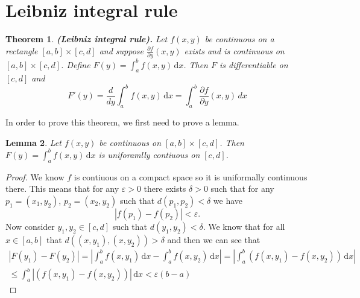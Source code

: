 \documentclass[11pt,a4paper]{article}
\theoremstyle{definition}
\theoremstyle{plain}
\newtheorem{theorem}{Theorem}[section]
\newtheorem{lemma}[theorem]{Lemma}
\newcommand\dx    {\,\mathrm{d}x}
\newcommand{\abs}[1]{\left\lvert #1\right\rvert}
\renewcommand{\tt}[1]{\textnormal{\textbf{(#1).}}} %
\begin{document}
	\newpage
	
	\section{Leibniz integral rule}
  \begin{theorem}\label{thm:leibniz-integral-rule}\tt{Leibniz integral rule}
    Let $f(x,y)$ be continuous on a rectangle $[a,b] \times [c,d]$ 
    and suppose $\frac{\partial f}{\partial y}(x,y)$ exists and is continuous 
    on $[a,b] \times [c,d]$. 
    Define $F(y) = \int_a^b{f(x,y)}\dx$.
    Then $F$ is differentiable on $[c,d]$ and
    \[
      F'(y) =
      \frac{d}{dy}\int_a^b{f(x,y)}\dx =
      \int_{a}^{b}{\frac{\partial f}{\partial y}(x,y)\, dx}
    \]
  \end{theorem}
  
  In order to prove this theorem, we first need to prove a lemma.
  \begin{lemma}
    Let $f(x,y)$ be continuous on $[a,b] \times [c,d]$.
    Then $F(y) = \int_{a}^{b} f(x,y)\dx$ is uniforamlly contiuous on $[c,d]$.
  \end{lemma}
  \begin{proof}
    We know $f$ is contiuous on a compact space so it is uniformally continuous 
    there. This means that for any $\varepsilon > 0$ there exists $\delta > 0$
    such that for any $p_1 = (x_1,y_2)$, $p_2 = (x_2,y_2)$ such that 
    $d(p_1,p_2) < \delta$ we have
    \[
      \abs{f(p_1) - f(p_2)} < \varepsilon.
    \]
    Now consider $y_1, y_2 \in[c,d]$ such that $d(y_1,y_2) < \delta$.
    We know that for all $x \in [a,b]$ that $d((x,y_1),(x,y_2)) > \delta$
    and then we can see that
    \begin{align*}
      |F(y_1)-F(y_2)| 
      = \abs{\int_{a}^{b} f(x,y_1)\dx - \int_a^b{f(x,y_2)\dx}}
      = \abs{\int_{a}^{b} (f(x,y_1) - f(x,y_2))\dx} \\
      \le \int_{a}^{b} \abs{(f(x,y_1) - f(x,y_2))}\dx < \varepsilon(b - a)
    \end{align*}
  \end{proof}
\end{document}
